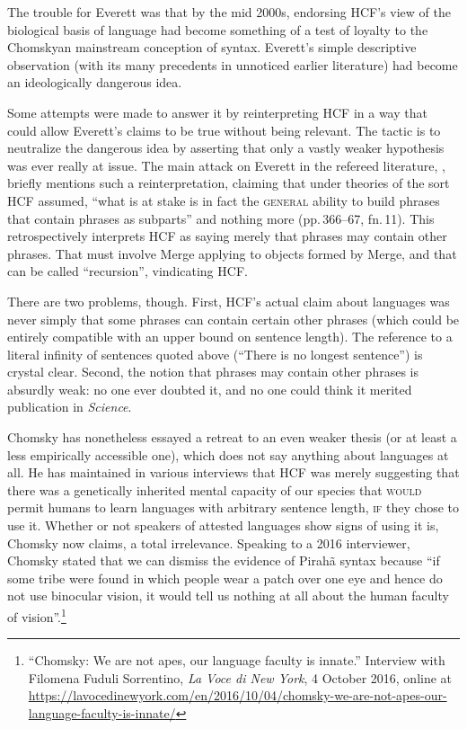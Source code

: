\documentclass[output=paper,colorlinks,citecolor=brown
]{langscibook}
\begin{document}
The trouble for Everett was that by the mid 2000s, endorsing HCF's view
of the biological basis of language had become something of a test of
loyalty to the Chomskyan mainstream conception of syntax. Everett's
simple descriptive observation (with its many precedents in unnoticed
earlier literature) had become an ideologically dangerous idea.

Some attempts were made to answer it by reinterpreting HCF in a way
that could allow Everett's claims to be true without being relevant.
The tactic is to neutralize the dangerous idea by asserting that only
a vastly weaker hypothesis was ever really at issue. The main attack
on Everett in the refereed literature, \citet{NevPesRod09a}, briefly
mentions such a reinterpretation, claiming that under theories of the
sort HCF assumed, ``what is at stake is in fact the \textsc{general}
ability to build phrases that contain phrases as subparts'' and nothing
more (pp.\,366--67, fn.\,11). This retrospectively interprets HCF as
saying merely that phrases may contain other phrases. That must involve
Merge applying to objects formed by Merge, and that can be called
``recursion'', vindicating HCF.

There are two problems, though. First, HCF's actual claim about
languages was never simply that some phrases can contain certain other
phrases (which could be entirely compatible with an upper bound on
sentence length). The reference to a literal infinity of sentences
quoted above (``There is no longest sentence'') is crystal clear. Second,
the notion that phrases may contain other phrases is absurdly weak:
no one ever doubted it, and no one could think it merited publication
in \textit{Science}.

Chomsky has nonetheless essayed a retreat to an even weaker thesis
(or at least a less empirically accessible one), which does not say
anything about languages at all. He has maintained in various interviews
that HCF was merely suggesting that there was a genetically inherited
mental capacity of our species that \textsc{would} permit humans to
learn languages with arbitrary sentence length, \textsc{if} they chose
to use it. Whether or not speakers of attested languages show signs
of using it is, Chomsky now claims, a total irrelevance. Speaking to
a 2016 interviewer, Chomsky stated that we can dismiss the evidence of
Pirah{\~a} syntax because ``if some tribe were found in which people
wear a patch over one eye and hence do not use binocular vision, it
would tell us nothing at all about the human faculty of
vision''.\footnote{\label{sorrentino}
   ``Chomsky: We are not apes, our language faculty is innate.''
   Interview with Filomena Fuduli Sorrentino, \textit{La Voce di New York},
   4 October 2016, online at
   \url{https://lavocedinewyork.com/en/2016/10/04/chomsky-we-are-not-apes-our-language-faculty-is-innate/}}
\end{document}
